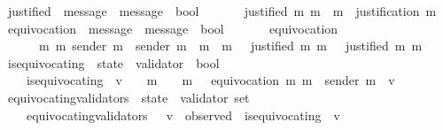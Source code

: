 \begin{isabellebody}
\isanewline
\isanewline
{}\isamarkupfalse%
\ justified\ {\isacharcolon}{\isacharcolon}\ {\isachardoublequoteopen}message\ {\isasymRightarrow}\ message\ {\isasymRightarrow}\ bool{\isachardoublequoteclose}\isanewline
\ \ \isanewline
\ \ \ \ {\isachardoublequoteopen}justified\ m{}\ m{}\ {\isacharequal}\ {\isacharparenleft}m{}\ {\isasymin}\ justification\ m{}{\isacharparenright}{\isachardoublequoteclose}\isanewline
\isanewline
{}\isamarkupfalse%
\ equivocation\ {\isacharcolon}{\isacharcolon}\ {\isachardoublequoteopen}{\isacharparenleft}message\ {\isacharasterisk}\ message{\isacharparenright}\ {\isasymRightarrow}\ bool{\isachardoublequoteclose}\isanewline
\ \ \isanewline
\ \ \ \ {\isachardoublequoteopen}equivocation\ {\isacharequal}\isanewline
\ \ \ \ \ \ {\isacharparenleft}{\isasymlambda}{\isacharparenleft}m{}{\isacharcomma}\ m{}{\isacharparenright}{\isachardot}\ sender\ m{}\ {\isacharequal}\ sender\ m{}\ {\isasymand}\ m{}\ {\isasymnoteq}\ m{}\ {\isasymand}\ {\isasymnot}\ {\isacharparenleft}justified\ m{}\ m{}{\isacharparenright}\ {\isasymand}\ {\isasymnot}\ {\isacharparenleft}justified\ m{}\ m{}{\isacharparenright}{\isacharparenright}{\isachardoublequoteclose}\isanewline
\isanewline
\isanewline
{}\isamarkupfalse%
\ is{\isacharunderscore}equivocating\ {\isacharcolon}{\isacharcolon}\ {\isachardoublequoteopen}state\ {\isasymRightarrow}\ validator\ {\isasymRightarrow}\ bool{\isachardoublequoteclose}\isanewline
\ \ \isanewline
\ \ \ \ {\isachardoublequoteopen}is{\isacharunderscore}equivocating\ {\isasymsigma}\ v\ {\isacharequal}\ \ {\isacharparenleft}{\isasymexists}\ m{}\ {\isasymin}\ {\isasymsigma}{\isachardot}\ {\isasymexists}\ m{}\ {\isasymin}\ {\isasymsigma}{\isachardot}\ equivocation\ {\isacharparenleft}m{}{\isacharcomma}\ m{}{\isacharparenright}\ {\isasymand}\ sender\ m{}\ {\isacharequal}\ v{\isacharparenright}{\isachardoublequoteclose}\isanewline
\isanewline
{}\isamarkupfalse%
\ equivocating{\isacharunderscore}validators\ {\isacharcolon}{\isacharcolon}\ {\isachardoublequoteopen}state\ {\isasymRightarrow}\ validator\ set{\isachardoublequoteclose}\isanewline
\ \ \isanewline
\ \ \ \ {\isachardoublequoteopen}equivocating{\isacharunderscore}validators\ {\isasymsigma}\ {\isacharequal}\ {\isacharbraceleft}v\ {\isasymin}\ observed\ {\isasymsigma}{\isachardot}\ is{\isacharunderscore}equivocating\ {\isasymsigma}\ v{\isacharbraceright}{\isachardoublequoteclose}\isanewline

\end{isabellebody}
